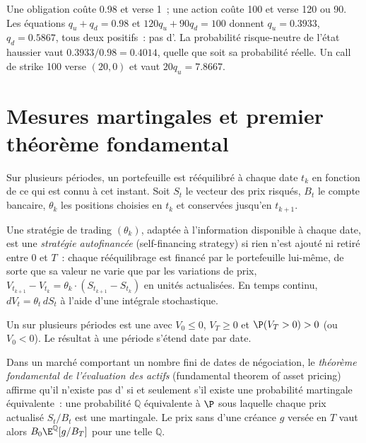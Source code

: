 \begin{example}\label{ex:dv:no-arbitrage-and-the-fundamental-theorems:binomial}
Une obligation coûte 0.98 et verse 1~; une action coûte 100 et verse 120 ou 90. Les
équations $q_u+q_d=0.98$ et $120q_u+90q_d=100$ donnent $q_u=0.3933$, $q_d=0.5867$,
tous deux positifs~: pas d'. La probabilité risque-neutre de l'état haussier vaut
$0.3933/0.98=0.4014$, quelle que soit sa probabilité réelle. Un call de strike 100
verse $(20,0)$ et vaut $20q_u=7.8667$.
\end{example}

\section{Mesures martingales et premier théorème fondamental}

Sur plusieurs périodes, un portefeuille est rééquilibré à chaque date $t_k$ en fonction
de ce qui est connu à cet instant. Soit $S_t$ le vecteur des prix risqués, $B_t$ le compte
bancaire, $\theta_k$ les positions choisies en $t_k$ et conservées jusqu'en $t_{k+1}$.

\begin{definition}\label{def:dv:no-arbitrage-and-the-fundamental-theorems:sf}
Une stratégie de trading $(\theta_k)$, adaptée à l'information disponible à chaque
date, est une \emph{stratégie autofinancée} (self-financing strategy) si
rien n'est ajouté ni retiré entre $0$ et $T$~: chaque rééquilibrage est financé
par le portefeuille lui-même, de sorte que sa valeur ne varie que par les variations de prix,
$V_{t_{k+1}}-V_{t_k}=\theta_k\cdot(S_{t_{k+1}}-S_{t_k})$ en unités actualisées. En
temps continu, $dV_t=\theta_t\,dS_t$ à l'aide d'une intégrale stochastique.
\end{definition}

Un  sur plusieurs périodes est une  avec $V_0\le0$,
$V_T\ge0$ et $\P(V_T>0)>0$ (ou $V_0<0$). Le résultat à une période s'étend date
par date.

\begin{theorem}\label{thm:dv:no-arbitrage-and-the-fundamental-theorems:ftap}
Dans un marché comportant un nombre fini de dates de négociation, le \emph{théorème fondamental de
l'évaluation des actifs} (fundamental theorem of asset pricing) affirme qu'il n'existe pas
d' si et seulement s'il existe une probabilité martingale équivalente~: une
probabilité $\mathbb Q$ équivalente à $\P$ sous laquelle chaque prix actualisé $S_t/B_t$ est une
martingale. Le prix sans  d'une créance $g$ versée en $T$
vaut alors $B_0\E^{\mathbb Q}[g/B_T]$ pour une telle $\mathbb Q$.
\end{theorem}
\admitted

